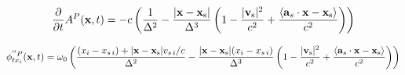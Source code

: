 \begin{equation}
\frac{\partial}{\partial t} A^{P}(\mathbf{x},t) = -c \left( \frac{1}{\Delta^2} - \frac{|\mathbf{x}-\mathbf{x}_{\mathrm{s}}|}{\Delta^3} \left( 1- \frac{|\mathbf{v}_{\mathrm{s}}|^2}{c^2} + \frac{\left< \mathbf{a}_s \cdot \mathbf{x}-\mathbf{x}_{\mathrm{s}} \right>}{c^2}\right)\right)
\end{equation}

\begin{equation}
\phi^{''P}_{t x_{i}}(\mathbf{x},t) =  \omega_0 \left( \frac{(x_i - x_{s \, i}) + |\mathbf{x}-\mathbf{x}_{\mathrm{s}}| v_{s \, i}/c }{\Delta^2} - \frac{|\mathbf{x}-\mathbf{x}_{\mathrm{s}}|(x_i - x_{s \, i})}{\Delta^3} \left( 1- \frac{|\mathbf{v}_{\mathrm{s}}|^2}{c^2} + \frac{\left< \mathbf{a}_s \cdot \mathbf{x}-\mathbf{x}_{\mathrm{s}} \right>}{c^2}\right) \right)
\end{equation}